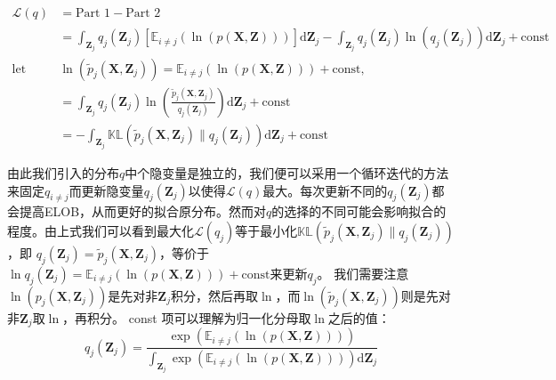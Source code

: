 \begin{displaymath}
\begin{split}
\mathcal{L}(q) &= \text{Part 1} - \text{Part 2} \\
&=\int_{\mathbf{Z}_j} q_j(\mathbf{Z}_j) \left [
\mathbb{E}_{i \neq j} \left (\ln (p(\mathbf{X}, \mathbf{Z})) \right)
 \right ] \mathrm{d} \mathbf{Z}_j
-\int_{\mathbf{Z}_j} q_j(\mathbf{Z}_j) \ln({q_j(\mathbf{Z}_j)}) \mathrm{d}\mathbf{Z}_j + \text{const}\\
\text{let  } & \ln(\tilde{p}_j(\mathbf{X}, \mathbf{Z}_j)) = \mathbb{E}_{i \neq j} \left (\ln (p(\mathbf{X}, \mathbf{Z})) \right) + \text{const} ,\\
 &=  \int_{\mathbf{Z}_j} q_j(\mathbf{Z}_j)\ln \left (
 \frac{ \tilde{p}_j(\mathbf{X}, \mathbf{Z}_j)}{q_j(\mathbf{Z}_j)} 
\right ) \mathrm{d} \mathbf{Z}_j + \text{const}\\
&= -\int_{\mathbf{Z}_j} \mathbb{KL}(\tilde{p}_j(\mathbf{X}, \mathbf{Z}_j) \| q_j(\mathbf{Z}_j))\mathrm{d} \mathbf{Z}_j + \text{const}
\end{split}
\end{displaymath}

由此我们引入的分布$q$中个隐变量是独立的，我们便可以采用一个循环迭代的方法来固定$q_{i \neq j}$而更新隐变量$q_j(\mathbf{Z}_j)$以使得$\mathcal{L}(q)$最大。每次更新不同的$q_j(\mathbf{Z}_j)$都会提高ELOB，从而更好的拟合原分布。然而对$q$的选择的不同可能会影响拟合的程度。由上式我们可以看到最大化$\mathcal{L}(q_j)$等于最小化$ \mathbb{KL}(\tilde{p}_j(\mathbf{X}, \mathbf{Z}_j) \| q_j(\mathbf{Z}_j))$，即 $q_j(\mathbf{Z}_j) = \tilde{p}_j(\mathbf{X}, \mathbf{Z}_j)$，等价于 $\ln q_j(\mathbf{Z}_j) =  \mathbb{E}_{i \neq j} \left (\ln (p(\mathbf{X}, \mathbf{Z})) \right) + \text{const}$来更新$q_j$。
我们需要注意$\ln(p_j(\mathbf{X}, \mathbf{Z}_j))$是先对非$\mathbf{Z}_j$积分，然后再取$\ln$，而$\ln(\tilde{p}_j(\mathbf{X}, \mathbf{Z}_j))$则是先对非$\mathbf{Z}_j$取$\ln$，再积分。
const 项可以理解为归一化分母取$\ln$之后的值：
\begin{displaymath}
q_j(\mathbf{Z}_j) = \frac{ \exp (\mathbb{E}_{i \neq j} \left (\ln (p(\mathbf{X}, \mathbf{Z}) ) \right))}
{\int_{\mathbf{Z}_j} \exp (\mathbb{E}_{i \neq j} \left( \ln (p(\mathbf{X}, \mathbf{Z})) \right) ) \mathrm{d} \mathbf{Z}_j }
\end{displaymath}
